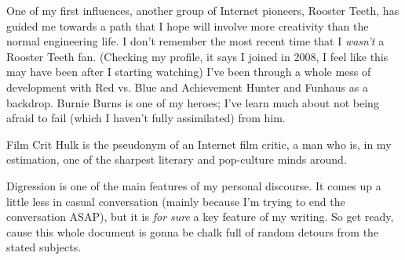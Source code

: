 \documentclass[./butidigress.tex]{subfiles}
\begin{document}
One of my first influences, another group of Internet pioneers, Rooster Teeth, has guided me towards a path that I hope will involve more creativity than the normal engineering life.
I don't remember the most recent time that I \emph{wasn't} a Rooster Teeth fan.
(Checking my profile, it says I joined in 2008, I feel like this may have been after I starting watching)
I've been through a whole mess of development with Red vs. Blue and Achievement Hunter and Funhaus as a backdrop.
Burnie Burns is one of my heroes; I've learn much about not being afraid to fail (which I haven't fully assimilated) from him.

Film Crit Hulk is the pseudonym of an Internet film critic, a man who is, in my estimation, one of the sharpest literary and pop-culture minds around.

\label{sec:thetitle}
Digression is one of the main features of my personal discourse.
It comes up a little less in casual conversation (mainly because I'm trying to end the conversation ASAP), but it is \emph{for sure} a key feature of my writing.
So get ready, cause this whole document is gonna be chalk full of random detours from the stated subjects.

\iffalse
\unnumsection{Margin Notes Notes}\margindate{6}{5}{18}
At this point, you may have seen the little multicolored notes that appear throughout the book.
The color and font style of each represents a different kind of note.
There are four types of note, commentary, todo, thought, and date.

\begin{itemize}
    \item {\commstyle\textcolor{\commcolor}{A commentary note represents some personal notes on the section}}
    \item {\todostyle\textcolor{\todocolor}{Todo notes are tasks I have yet to complete}}
    \item {\thoughtstyle\textcolor{\thoughtcolor}{Thought notes contain thoughts, related or unrelated to the subject at hand, that I had while writing}}
    \item {\textcolor{\datecolor}{Date notes contain the date/time I started the current section}}
\end{itemize}
\fi
\end{document}
